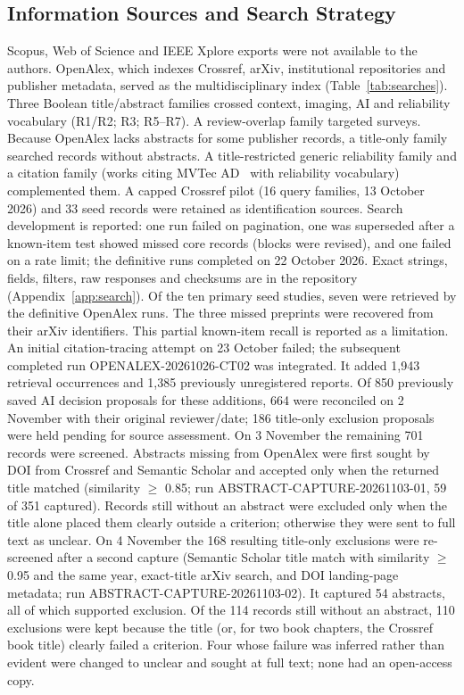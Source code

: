 \documentclass[journal]{IEEEtran}
\begin{document}
\subsection{Information Sources and Search Strategy}
Scopus, Web of Science and IEEE Xplore exports were not available to the authors. OpenAlex, which indexes Crossref, arXiv, institutional repositories and publisher metadata, served as the multidisciplinary index (Table~\ref{tab:searches}). Three Boolean title/abstract families crossed context, imaging, AI and reliability vocabulary (R1/R2; R3; R5--R7). A review-overlap family targeted surveys. Because OpenAlex lacks abstracts for some publisher records, a title-only family searched records without abstracts. A title-restricted generic reliability family and a citation family (works citing MVTec AD~\cite{bergmann2019mvtec} with reliability vocabulary) complemented them. A capped Crossref pilot (16 query families, 13 October 2026) and 33 seed records were retained as identification sources. Search development is reported: one run failed on pagination, one was superseded after a known-item test showed missed core records (blocks were revised), and one failed on a rate limit; the definitive runs completed on 22 October 2026. Exact strings, fields, filters, raw responses and checksums are in the repository (Appendix~\ref{app:search}). Of the ten primary seed studies, seven were retrieved by the definitive OpenAlex runs. The three missed preprints were recovered from their arXiv identifiers. This partial known-item recall is reported as a limitation. An initial citation-tracing attempt on 23 October failed; the subsequent completed run OPENALEX-20261026-CT02 was integrated. It added 1,943 retrieval occurrences and 1,385 previously unregistered reports. Of 850 previously saved AI decision proposals for these additions, 664 were reconciled on 2 November with their original reviewer/date; 186 title-only exclusion proposals were held pending for source assessment. On 3 November the remaining 701 records were screened. Abstracts missing from OpenAlex were first sought by DOI from Crossref and Semantic Scholar and accepted only when the returned title matched (similarity $\geq$ 0.85; run ABSTRACT-CAPTURE-20261103-01, 59 of 351 captured). Records still without an abstract were excluded only when the title alone placed them clearly outside a criterion; otherwise they were sent to full text as unclear. On 4 November the 168 resulting title-only exclusions were re-screened after a second capture (Semantic Scholar title match with similarity $\geq$ 0.95 and the same year, exact-title arXiv search, and DOI landing-page metadata; run ABSTRACT-CAPTURE-20261103-02). It captured 54 abstracts, all of which supported exclusion. Of the 114 records still without an abstract, 110 exclusions were kept because the title (or, for two book chapters, the Crossref book title) clearly failed a criterion. Four whose failure was inferred rather than evident were changed to unclear and sought at full text; none had an open-access copy.
\end{document}

